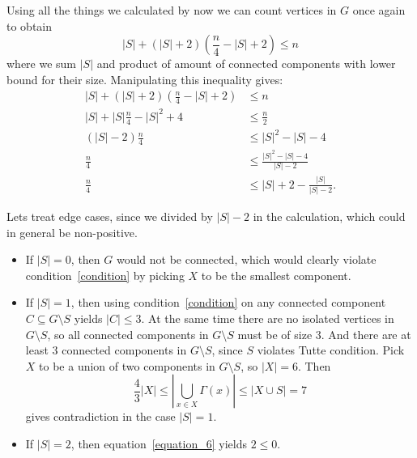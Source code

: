 \begin{exercise}{4}
\begin{itemize}
        Using all the things we calculated by now we can count vertices in $G$
        once again to obtain
        \begin{equation}\label{equation_6}
            |S| + (|S| + 2) \left( \frac{n}{4} - |S| + 2 \right) \leq n
        \end{equation}
        where we sum $|S|$ and product of amount of connected components with
        lower bound for their size. Manipulating this inequality gives:
        \begin{align*}
            |S| + (|S| + 2) \left( \frac{n}{4} - |S| + 2 \right) &\leq n \\
            |S| + |S| \frac{n}{4} - |S|^2 + 4 &\leq \frac{n}{2} \\
            (|S| - 2) \frac{n}{4} &\leq |S|^2 - |S| - 4 \\
            \frac{n}{4} &\leq \frac{|S|^2 - |S| - 4}{|S| - 2} \\
            \frac{n}{4} &\leq |S| + 2 - \frac{|S|}{|S| - 2}.
        \end{align*}


        Lets treat edge cases, since we divided by $|S| - 2$ in the calculation,
        which could in general be non-positive.
        \begin{itemize}
            \item{If $|S| = 0$, then $G$ would not be connected, which would
                clearly violate condition~\ref{condition} by picking $X$ to be
                the smallest component.}
            \item{If $|S| = 1$, then using condition~\ref{condition} on any connected
                component $C \subseteq G \setminus S$ yields $|C| \leq 3$. At
                the same time there are no isolated vertices in $G \setminus S$,
                so all connected components in $G \setminus S$ must be of size
                $3$. And there are at least $3$ connected components in $G
                \setminus S$, since $S$ violates Tutte condition. Pick $X$ to be
                a union of two components in $G \setminus S$, so $|X| = 6$. Then
                \begin{equation*}
                    \frac{4}{3} |X| \leq | \bigcup_{x \in X} \Gamma(x) | \leq |X
                    \cup S| = 7
                \end{equation*}
                gives contradiction in the case $|S| = 1$.
                }
            \item{If $|S| = 2$, then equation~\ref{equation_6} yields $2 \leq
                0$.}
        \end{itemize}


\end{itemize}
\end{exercise}
